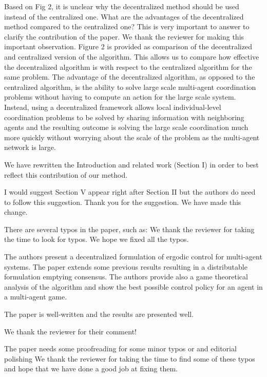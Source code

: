 \documentclass[10pt]{article}
\begin{document}
\begin{response}{
Based on Fig 2, it is unclear why the decentralized method should be used instead of the centralized one. 
What are the advantages of the decentralized method compared to the centralized one?  
This is very important to answer to clarify the contribution of the paper.
}
We thank the reviewer for making this important observation. 
Figure 2 is provided as comparison of the decentralized and centralized version of the algorithm. 
This allows us to compare how effective the decentralized algorithm is with respect to the centralized algorithm for the same problem.
The advantage of the decentralized algorithm, as opposed to the centralized algorithm, is the ability to solve large scale multi-agent coordination problems without having to compute an action for the large scale system.
Instead, using a decentralized framework allows local individual-level coordination problems to be solved by sharing information with neighboring agents and the resulting outcome is solving the large scale coordination much more quickly without worrying about the scale of the problem as the multi-agent network is large.

We have rewritten the Introduction and related work (Section I) in order to best reflect this contribution of our method. 
\end{response}

\begin{response}{
I would suggest Section V appear right after Section II but the
authors do need to follow this suggestion. }
Thank you for the suggestion. 
We have made this change.
\end{response}

\begin{response}{There are several typos in the paper, such as:}
We thank the reviewer for taking the time to look for typos.
We hope we fixed all the typos. 
\end{response}


\begin{response}{The authors present a decentralized formulation of ergodic control for
multi-agent systems. The paper extends some previous results resulting
in a distributable formulation emptying consensus. The authors provide
also a game theoretical analysis of the algorithm and show the best
possible control policy for an agent in a multi-agent game.

The paper is well-written and the results are presented well.
}
We thank the reviewer for their comment!
\end{response}

\begin{response}{
The paper needs some proofreading for some minor typos or and editorial polishing
}
We thank the reviewer for taking the time to find some of these typos and hope that we have done a good job at fixing them.
\end{response}
\end{document}
